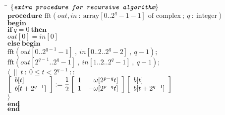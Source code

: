 \begin{tabbing}
	\quad\=\quad\=\quad\=\kill
	$\color{MidnightBlue}\curlb{\textit{\ttfamily extra procedure for recursive algorithm}}$\\
	$\mathbf{procedure} \textrm{ fft}(\mathit{out},\mathit{in}\ :\ \mathrm{array}[0..2^{q}-1-1] \textrm{ of complex}\ ;\ q\ :\ \mathrm{integer})$ \\
	$\mathbf{begin}$\\
		\>$\mathbf{if}\ q=0\ \mathbf{then}$\\
			\>\>$\mathit{out}[0] = \mathit{in}[0]$\\
		\>$\mathbf{else}\ \mathbf{begin}$\\
			\>\>$\mathrm{fft}(\mathit{out}[0..2^{q-1}-1]\ ,\ \mathit{in}[0..2..2^{q}-2]\ ,\ q-1);$\\
			\>\>$\mathrm{fft}(\mathit{out}[2^{q-1}..2^q-1]\ ,\ \mathit{in}[1..2..2^{q}-1]\ ,\ q-1);$\\
			\>\>$\langle \ \|\ t\ :\ 0\leq t<2^{q-1}\ ::$\\
				\>\>\>$\boxb{ \begin{array}{l} b[t] \\ b[t+2^{q-1}] \end{array} } := \dfrac{1}{2} \boxb{ \begin{array}{lr} 1 & \omega[2^{p-q}t] \\ 1 & -\omega[2^{p-q}t] \end{array} }\boxb{ \begin{array}{l} b[t] \\ b[t+2^{q-1}] \end{array} }$\\
			\>\>$\rangle$\\
		\>$\mathbf{end}$\\
	$\mathbf{end}$\\
\end{tabbing}